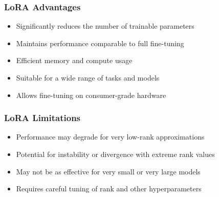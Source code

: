 \begin{frame}[fragile]\frametitle{LoRA Advantages}
\begin{itemize}
    \item Significantly reduces the number of trainable parameters
    \item Maintains performance comparable to full fine-tuning
    \item Efficient memory and compute usage
    \item Suitable for a wide range of tasks and models
    \item Allows fine-tuning on consumer-grade hardware
\end{itemize}
\end{frame}

\begin{frame}[fragile]\frametitle{LoRA Limitations}
\begin{itemize}
    \item Performance may degrade for very low-rank approximations
    \item Potential for instability or divergence with extreme rank values
    \item May not be as effective for very small or very large models
    \item Requires careful tuning of rank and other hyperparameters
\end{itemize}
\end{frame}




